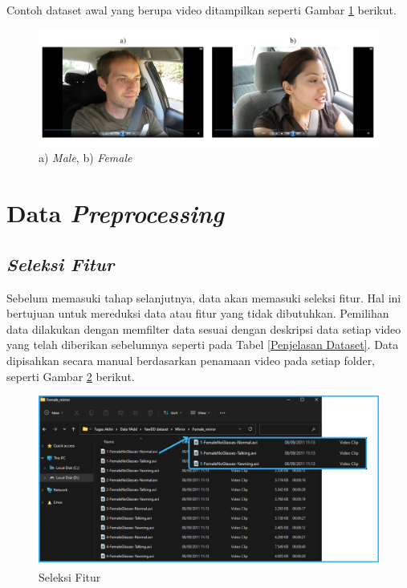     Contoh dataset awal yang berupa video ditampilkan seperti Gambar \ref{Dataset Video} berikut.


           
     \begin{figure}[H]
         \centering
             \centering
             \includegraphics[width=\textwidth]{figures/bab4/data video.png}
             \caption{a) \textit{Male}, b) \textit{Female}}
             \label{Dataset Video}
     \end{figure}

    


\section{Data \textit{Preprocessing}}

\subsection{\textit{Seleksi Fitur}}

    
   Sebelum memasuki tahap selanjutnya, data akan memasuki seleksi fitur. Hal ini bertujuan untuk mereduksi data atau fitur yang tidak dibutuhkan. Pemilihan data dilakukan dengan memfilter data sesuai dengan deskripsi data setiap video yang telah diberikan sebelumnya seperti pada Tabel \ref{Penjelasan Dataset}. Data dipisahkan secara manual berdasarkan penamaan video pada setiap folder, seperti Gambar \ref{Seleksi_Fitur} berikut.

     \begin{figure}[H]
         \centering
             \centering
             \includegraphics[width=\textwidth]{figures/bab4/seleksi_fitur.png}
             \caption{Seleksi Fitur}
             \label{Seleksi_Fitur}
     \end{figure}
   
